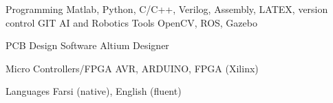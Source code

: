 

\begin{cvskills}



  
  \cvskill
    {Programming} %
    {Matlab, Python, C/C++, Verilog, Assembly, LATEX, version control GIT} %
  \cvskill
    {AI and Robotics Tools} %
    {OpenCV, ROS, Gazebo} %

  \cvskill
    {PCB Design Software} %
    {Altium Designer} %


  \cvskill
    {Micro Controllers/FPGA } %
    {AVR, ARDUINO, FPGA (Xilinx)} %

  \cvskill
    {Languages} %
    {Farsi (native), English (fluent)} %

\end{cvskills}

